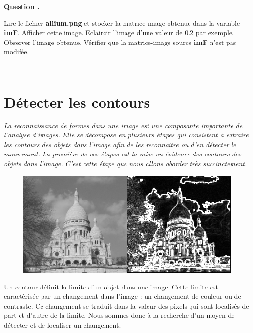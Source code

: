 \documentclass[t,11pt,eleve]{article}
\newcounter{cexo}
\newenvironment{qexo}{
\refstepcounter{cexo}
\vspace{3 pt}
\noindent
\begin{minipage}[t]{0.15\textwidth}
\textbf{\noindent Question \arabic{cexo}. }
\end{minipage}\noindent
\begin{minipage}[t]{0.85\textwidth}}{\vspace{3 pt}
\end{minipage}}%
\begin{document}
 
\begin{qexo}
Lire le fichier \textbf{allium.png} et stocker la matrice image obtenue dans la variable \textbf{imF}. Afficher cette image. Eclaircir l'image d'une valeur de 0.2 par exemple. Observer l'image obtenue. Vérifier que la matrice-image source \textbf{imF} n'est pas modifée. 
\end{qexo}\\



\section{Détecter les contours}

\textit{La reconnaissance de formes dans une image est une composante importante de l'analyse d'images.
Elle se décompose en plusieurs étapes qui consistent à extraire les contours des objets dans l'image afin
de les reconnaitre ou d'en détecter le mouvement. La première de ces étapes est la mise en évidence
des contours des objets dans l'image. C'est cette étape que nous allons aborder très succinctement.}
\\

\begin{figure}[!h]
\includegraphics[width=1\textwidth]{edges.png}
\end{figure}
\newpage
Un contour définit la limite d'un objet dans une image. Cette limite est caractérisée par un changement
dans l'image : un changement de couleur ou de contraste. Ce changement se traduit dans la valeur des pixels qui sont localisés de part et d’autre de la limite.
Nous sommes donc à la recherche d’un moyen de détecter et de localiser un changement.\\
\end{document}
